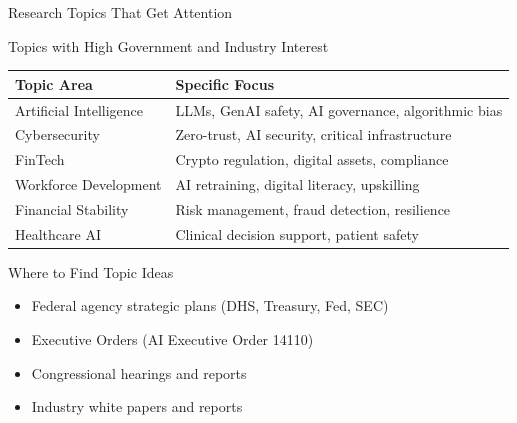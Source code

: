 \documentclass[11pt]{beamer}
\begin{document}
	\begin{frame}{Research Topics That Get Attention}
		\scriptsize
		\begin{block}{Topics with High Government and Industry Interest}
			\centering
			\begin{tabular}{|p{5cm}|p{5cm}|}
				\hline
				\textbf{Topic Area} & \textbf{Specific Focus} \\
				\hline
				Artificial Intelligence & LLMs, GenAI safety, AI governance, algorithmic bias \\
				\hline
				Cybersecurity & Zero-trust, AI security, critical infrastructure \\
				\hline
				FinTech & Crypto regulation, digital assets, compliance \\
				\hline
				Workforce Development & AI retraining, digital literacy, upskilling \\
				\hline
				Financial Stability & Risk management, fraud detection, resilience \\
				\hline
				Healthcare AI & Clinical decision support, patient safety \\
				\hline
			\end{tabular}
		\end{block}
		\begin{block}{Where to Find Topic Ideas}
			\begin{itemize}
				\item Federal agency strategic plans (DHS, Treasury, Fed, SEC)
				\item Executive Orders (AI Executive Order 14110)
				\item Congressional hearings and reports
				\item Industry white papers and reports
			\end{itemize}
		\end{block}
	\end{frame}
	
\end{document}
